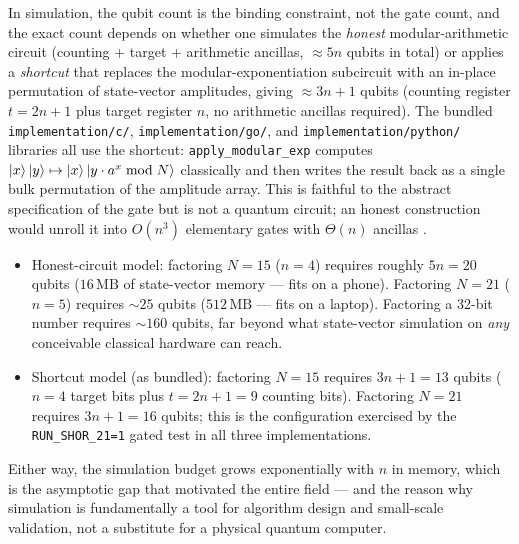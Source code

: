 In simulation, the qubit count is the binding constraint, not the gate count, and the exact count depends on whether one simulates the \emph{honest} modular-arithmetic circuit (counting + target + arithmetic ancillas, $\approx 5n$ qubits in total) or applies a \emph{shortcut} that replaces the modular-exponentiation subcircuit with an in-place permutation of state-vector amplitudes, giving $\approx 3n+1$ qubits (counting register $t = 2n+1$ plus target register $n$, no arithmetic ancillas required). The bundled \texttt{implementation/c/}, \texttt{implementation/go/}, and \texttt{implementation/python/} libraries all use the shortcut: \texttt{apply\_modular\_exp} computes $\mathinner{|{x}\rangle}\mathinner{|{y}\rangle} \mapsto \mathinner{|{x}\rangle}\mathinner{|{y\cdot a^x \bmod N}\rangle}$ classically and then writes the result back as a single bulk permutation of the amplitude array. This is faithful to the abstract specification of the gate but is not a quantum circuit; an honest construction would unroll it into $O(n^3)$ elementary gates with $\Theta(n)$ ancillas \cite{beauregard2003}.
\begin{itemize}
\item Honest-circuit model: factoring $N=15$ ($n=4$) requires roughly $5n=20$ qubits ($16\,\text{MB}$ of state-vector memory --- fits on a phone). Factoring $N=21$ ($n=5$) requires $\sim 25$ qubits ($512\,\text{MB}$ --- fits on a laptop). Factoring a 32-bit number requires $\sim 160$ qubits, far beyond what state-vector simulation on \emph{any} conceivable classical hardware can reach.
\item Shortcut model (as bundled): factoring $N=15$ requires $3n+1 = 13$ qubits ($n=4$ target bits plus $t = 2n+1 = 9$ counting bits). Factoring $N=21$ requires $3n+1 = 16$ qubits; this is the configuration exercised by the \texttt{RUN\_SHOR\_21=1} gated test in all three implementations.
\end{itemize}
Either way, the simulation budget grows exponentially with $n$ in memory, which is the asymptotic gap that motivated the entire field --- and the reason why simulation is fundamentally a tool for algorithm design and small-scale validation, not a substitute for a physical quantum computer.
